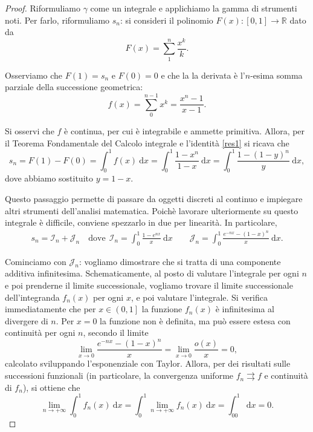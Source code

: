 \begin{proof}
	Riformuliamo $ \gamma$ come un integrale e applichiamo la gamma di strumenti noti. 
	Per farlo, riformuliamo $s_n$: si consideri il polinomio $F(x):[0,1] \to \mathbb{R}$ dato da
	\begin{equation*}
		F(x)= 
		\sum^n_1 \frac{x^k}{k}.
	\end{equation*}

	Osserviamo che $F(1)=s_n$ e $F(0)=0$ e che la la derivata è l'$n$-esima somma parziale della successione geometrica:
	\begin{equation}
		\label{res1}
		f(x)= 
		\sum^{n-1}_0x^k= 
		\frac{x^n-1}{x-1}.
	\end{equation}

	Si osservi che $f$ è continua, per cui è integrabile e ammette primitiva. 
	Allora, per il Teorema Fondamentale del Calcolo integrale e l'identità \ref{res1} si ricava che
	\begin{equation*}
		s_n=
		F(1)-F(0)= 
		\int^1_0f(x) \: \mathrm{d}x= 
		\int^1_0 \frac{1-x^n}{1-x} \: \mathrm{d}x= 
		\int^1_0 \frac{1-(1-y)^n}{y} \: \mathrm{d}x,
	\end{equation*}
	dove abbiamo sostituito $y=1-x$.

	Questo passaggio permette di passare da oggetti discreti al continuo e impiegare altri strumenti dell'analisi matematica. 
	Poichè lavorare ulteriormente su questo integrale è difficile, conviene spezzarlo in due per linearità. 
	In particolare,
	\begin{gather*}
		s_n = 
		\mathcal{I}_n + \mathcal{J}_n \quad \text{dove} \ \
		\mathcal{I}_n = \int^1_0 \frac{1-e^{nx}}{x} \: \mathrm{d} x 
		\qquad 
		\mathcal{J}_n= \int^1_0 \frac{e^{-nx}-(1-x)^n}{x} \: \mathrm{d} x.
	\end{gather*}

	Cominciamo con $ \mathcal{J}_n$: vogliamo dimostrare che si tratta di una componente additiva infinitesima. 
	Schematicamente, al posto di valutare l'integrale per ogni $n$ e poi prenderne il limite successionale, vogliamo trovare il limite successionale dell'integranda $f_n(x)$ per ogni $x$, e poi valutare l'integrale. 
	Si verifica immediatamente che per $x \in \left( 0,1 \right]$ la funzione $f_n(x)$ è infinitesima al divergere di $n$. Per $x=0$ la funzione non è definita, ma può essere estesa con continuità per ogni $n$, secondo il limite
	\begin{equation*}
		\lim \limits_{x \to0} \frac{e^{-nx}-(1-x)^n}{x}= 
		\lim \limits_{x \to0} \frac{o(x)}{x}=
		0,
	\end{equation*}
	calcolato sviluppando l'esponenziale con Taylor. 
	Allora, per dei risultati sulle successioni funzionali (in particolare, la convergenza uniforme $f_n \rightrightarrows f$ e continuità di $f_n$), si ottiene che
	\begin{equation*}
		\lim \limits_{n \to+ \infty} \int^1_0f_n(x) \: \mathrm{d}x= 
		\int^1_0 \lim \limits_{n \to+ \infty}f_n(x) \: \mathrm{d}x=
		\int^1_00 \: \mathrm{d}x=
		0.
	\end{equation*}


\end{proof}
